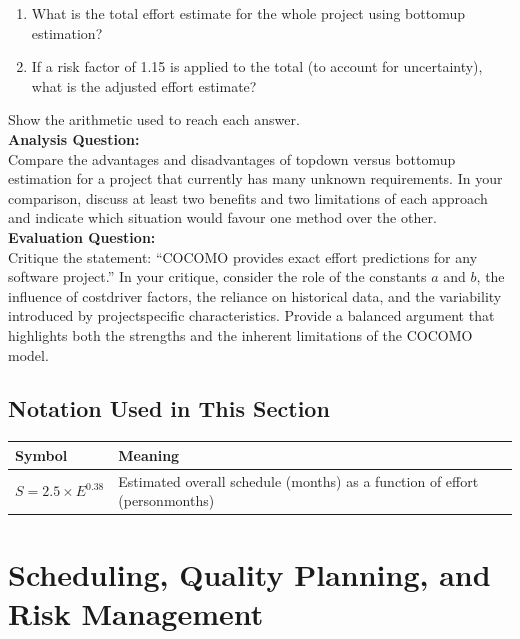 \documentclass[12pt, a4paper]{article}
\begin{document}
\begin{enumerate}
  \item What is the total effort estimate for the whole project using bottomup estimation?
  \item If a risk factor of 1.15 is applied to the total (to account for uncertainty), what is the adjusted effort estimate?
\end{enumerate}
Show the arithmetic used to reach each answer.\\
\newpage
\textbf{Analysis Question:}\\
Compare the advantages and disadvantages of topdown versus bottomup estimation for a project that currently has many unknown requirements. In your comparison, discuss at least two benefits and two limitations of each approach and indicate which situation would favour one method over the other.\\
\newpage
\textbf{Evaluation Question:}\\
Critique the statement: ``COCOMO provides exact effort predictions for any software project.''  
In your critique, consider the role of the constants \(a\) and \(b\), the influence of costdriver factors, the reliance on historical data, and the variability introduced by projectspecific characteristics. Provide a balanced argument that highlights both the strengths and the inherent limitations of the COCOMO model.\\
\newpage

\newpage

\subsection*{Notation Used in This Section}
\begin{tabular}{@{}ll@{}}
\toprule
Symbol & Meaning \\ \midrule
    $S = 2.5 \times E^{0.38}$ & Estimated overall schedule (months) as a function of effort (personmonths) \\
\bottomrule
\end{tabular}
\vspace{1em}

\section{Scheduling, Quality Planning, and Risk Management}
\end{document}
